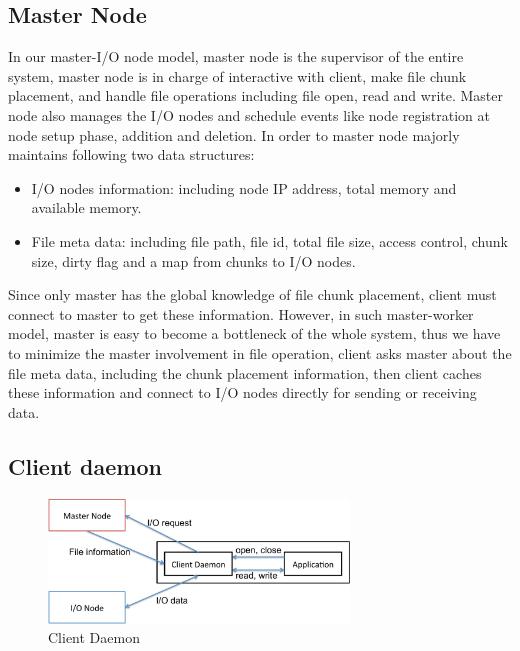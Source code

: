 \subsection{Master Node}
In our master-I/O node model, master node is the supervisor of the entire system,
master node is in charge of interactive with client, make file chunk placement, and handle file operations including file open, read and write.
Master node also manages the I/O nodes and schedule events like node registration at node setup
phase, addition and deletion.
In order to master node majorly maintains following two data structures:
\begin{itemize}
  \item I/O nodes information: including node IP address, total memory and
  available memory. 
  \item File meta data: including file path, file id, total file size, access control, chunk size,
  dirty flag and a map from chunks to I/O nodes.
\end{itemize}

Since only master has the global knowledge of file chunk placement, client must connect to master
to get these information.
However, in such master-worker model, master is easy to become a bottleneck of the whole system,
thus we have to minimize the master involvement in file operation, client asks master about the
file meta data, including the chunk placement information, then client caches these information and
connect to I/O nodes directly for sending or receiving data.

\subsection{Client daemon}

\begin{figure}[tb]
	\centering
	\includegraphics[width=8cm]{img/client_daemon}
	\caption{Client Daemon}
	\label{implementaion:client_daemon}
\end{figure}

